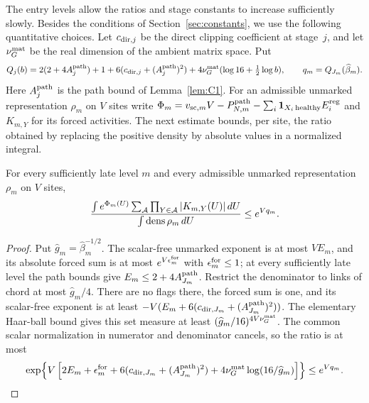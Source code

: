 The entry levels allow the ratios and stage constants to increase sufficiently slowly. Besides the conditions of Section~\ref{sec:constants}, we use the following quantitative choices. Let $c_{{\rm dir},j}$ be the direct clipping coefficient at stage~$j$, and let $\nu_G^{\rm mat}$ be the real dimension of the ambient matrix space. Put
\begin{equation}\label{eq:E-vacuum-majorant}
Q_j(b)=2(2+4A_j^{\rm path})+1+6(c_{{\rm dir},j}+(A_j^{\rm path})^2)
 +4\nu_G^{\rm mat}(\log16+\tfrac12\log b),\qquad q_m=Q_{J_m}(\widehat\beta_m).
\end{equation}
Here $A_j^{\rm path}$ is the path bound of Lemma~\ref{lem:C1}. For an admissible unmarked representation $\rho_m$ on $V$ sites write $\Phi_m=v_{{\rm sc},m}V-P^{\mathrm{path}}_{N,m}-\sum_i\mathbf1_{X_i\,\mathrm{healthy}}E_i^{\rm reg}$ and $K_{m,Y}$ for its forced activities. The next estimate bounds, per site, the ratio obtained by replacing the positive density by absolute values in a normalized integral.
\begin{lemma}\label{lem:E-normalization-cost}
For every sufficiently late level $m$ and every admissible unmarked representation $\rho_m$ on $V$ sites,
\begin{equation}\label{eq:E-vacuum-ratio}
 \frac{\int e^{\Phi_m(U)}\sum_{\mathcal A}\prod_{Y\in\mathcal A}|K_{m,Y}(U)|\,dU}
 {\int\operatorname{dens}\rho_m\,dU}\le e^{Vq_m}.
\end{equation}
\end{lemma}
\begin{proof}
Put $\widehat g_m=\widehat\beta_m^{-1/2}$. The scalar-free unmarked exponent is at most $VE_m$, and its absolute forced sum is at most $e^{V\epsilon_m^{\rm for}}$ with $\epsilon_m^{\rm for}\le1$; at every sufficiently late level the path bounds give $E_m\le2+4A_{J_m}^{\rm path}$. Restrict the denominator to links of chord at most $\widehat g_m/4$. There are no flags there, the forced sum is one, and its scalar-free exponent is at least $-V(E_m+6(c_{{\rm dir},J_m}+(A_{J_m}^{\rm path})^2))$. The elementary Haar-ball bound gives this set measure at least $(\widehat g_m/16)^{4V\nu_G^{\rm mat}}$. The common scalar normalization in numerator and denominator cancels, so the ratio is at most
\begin{equation*}
 \exp\!\left\{V\left[2E_m+\epsilon_m^{\rm for}
 +6(c_{{\rm dir},J_m}+(A_{J_m}^{\rm path})^2)
 +4\nu_G^{\rm mat}\log(16/\widehat g_m)\right]\right\}\le e^{Vq_m}.
\qedhere
\end{equation*}
\end{proof}
